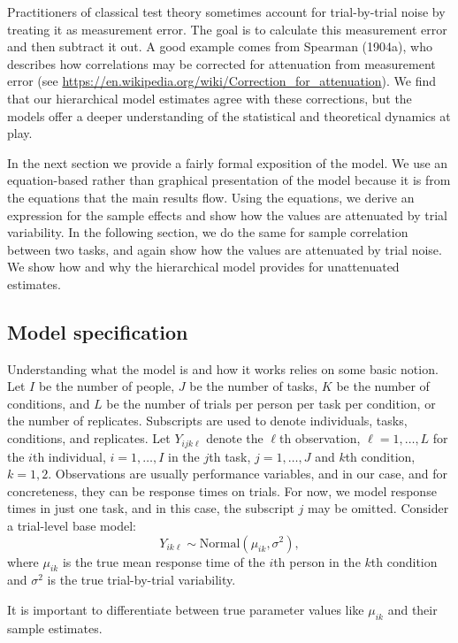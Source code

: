 \documentclass[english,man]{apa6}
\theoremstyle{definition}
\theoremstyle{definition}
\theoremstyle{definition}
\theoremstyle{remark}
\begin{document}
Practitioners of classical test theory sometimes account for
trial-by-trial noise by treating it as measurement error. The goal is to
calculate this measurement error and then subtract it out. A good
example comes from Spearman (1904a), who describes how correlations may
be corrected for attenuation from measurement error (see
\url{https://en.wikipedia.org/wiki/Correction_for_attenuation}). We find
that our hierarchical model estimates agree with these corrections, but
the models offer a deeper understanding of the statistical and
theoretical dynamics at play.

In the next section we provide a fairly formal exposition of the model.
We use an equation-based rather than graphical presentation of the model
because it is from the equations that the main results flow. Using the
equations, we derive an expression for the sample effects and show how
the values are attenuated by trial variability. In the following
section, we do the same for sample correlation between two tasks, and
again show how the values are attenuated by trial noise. We show how and
why the hierarchical model provides for unattenuated estimates.

\subsection{Model specification}\label{model-specification}

Understanding what the model is and how it works relies on some basic
notion. Let \(I\) be the number of people, \(J\) be the number of tasks,
\(K\) be the number of conditions, and \(L\) be the number of trials per
person per task per condition, or the number of replicates. Subscripts
are used to denote individuals, tasks, conditions, and replicates. Let
\(Y_{ijk\ell}\) denote the \(\ell\)th observation,
\(\ell = 1, \ldots, L\) for the \(i\)th individual, \(i = 1, \ldots, I\)
in the \(j\)th task, \(j = 1, \ldots, J\) and \(k\)th condition,
\(k = 1, 2\). Observations are usually performance variables, and in our
case, and for concreteness, they can be response times on trials. For
now, we model response times in just one task, and in this case, the
subscript \(j\) may be omitted. Consider a trial-level base model: \[
Y_{ik\ell} \sim \mbox{Normal}(\mu_{ik},\sigma^2),
\] where \(\mu_{ik}\) is the true mean response time of the \(i\)th
person in the \(k\)th condition and \(\sigma^2\) is the true
trial-by-trial variability.

It is important to differentiate between true parameter values like
\(\mu_{ik}\) and their sample estimates.
\end{document}
